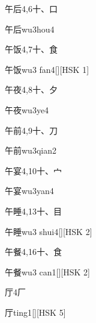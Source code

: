 \begin{entry}{午后}{4,6}{⼗、⼝}
  \begin{phonetics}{午后}{wu3hou4}
  \end{phonetics}
\end{entry}

\begin{entry}{午饭}{4,7}{⼗、⾷}
  \begin{phonetics}{午饭}{wu3 fan4}[][HSK 1]
  \end{phonetics}
\end{entry}

\begin{entry}{午夜}{4,8}{⼗、⼣}
  \begin{phonetics}{午夜}{wu3ye4}
  \end{phonetics}
\end{entry}

\begin{entry}{午前}{4,9}{⼗、⼑}
  \begin{phonetics}{午前}{wu3qian2}
  \end{phonetics}
\end{entry}

\begin{entry}{午宴}{4,10}{⼗、⼧}
  \begin{phonetics}{午宴}{wu3yan4}
  \end{phonetics}
\end{entry}

\begin{entry}{午睡}{4,13}{⼗、⽬}
  \begin{phonetics}{午睡}{wu3 shui4}[][HSK 2]
  \end{phonetics}
\end{entry}

\begin{entry}{午餐}{4,16}{⼗、⾷}
  \begin{phonetics}{午餐}{wu3 can1}[][HSK 2]
  \end{phonetics}
\end{entry}

\begin{entry}{厅}{4}{⼚}
  \begin{phonetics}{厅}{ting1}[][HSK 5]
  \end{phonetics}
\end{entry}

